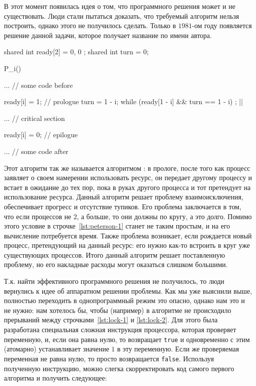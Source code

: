 
В этот момент появилась идея о том, что программного решения может и не
существовать. Люди стали пытаться доказать, что требуемый алгоритм нельзя
построить, однако этого не получилось сделать. Только в \(1981\)-ом году
появляется решение данной задачи, которое получает название по имени автора.

\begin{ccode}
  shared int ready[2] = { 0, 0 };
  shared int turn = 0;

  P_i() {
    ... // some code before

    ready[i] = 1; // prologue
    turn = 1 - i;
    while (ready[1 - i] && turn == 1 - i) {}; |\label{lst:peterson-1}|

    ... // critical section

    ready[i] = 0; // epilogue

    ... // some code after
  }
\end{ccode}

Этот алгоритм так же называется алгоритмом : в
прологе, после того как процесс заявляет о своем намерении использовать ресурс,
он передает  другому процессу и встает в ожидание до тех пор, пока
 в руках другого процесса и тот претендует на использование ресурса.
Данный алгоритм решает проблему взаимоисключения, обеспечивает прогресс и
отсутствие тупиков. Его проблема заключается в том, что если процессов не \(2\),
а больше, то они должны  по кругу, а это долго.
Помимо этого условие в строчке~\ref{lst:peterson-1} станет не таким простым, и
на его вычисление потребуется время. Также проблема возникает, если рождается
новый процесс, претендующий на данный ресурс: его нужно как-то встроить в круг
уже существующих процессов. Итого данный алгоритм решает поставленную проблему,
но его накладные расходы могут оказаться слишком большими.


Т.к. найти эффективного программного решения не получилось, то люди вернулись к
идее об аппаратном решении проблемы. Как мы уже выяснили выше, полностью
переходить в однопрограммный режим это опасно, однако нам это и не нужно: нам
хотелось бы, чтобы (например) в алгоритме  не происходило
прерываний между строчками~\ref{lst:lock-1} и \ref{lst:lock-2}. Для этого была
разработана специальная сложная инструкция процессора, которая проверяет
переменную, и, если она равна нулю, то возвращает \texttt{true} и одновременно с
этим (атомарно) устанавливает значение \(1\) в эту переменную. Если же
проверяемая переменная не равна нулю, то просто возвращается \texttt{false}.
Используя полученную инструкцию, можно слегка скорректировать код самого первого
алгоритма и получить следующее:

